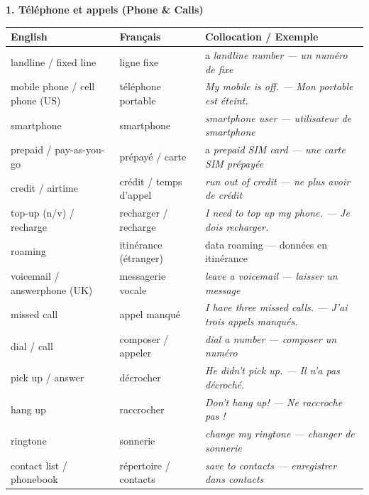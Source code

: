 \documentclass[11pt]{article}
\newcommand{\cle}[1]{{\popxbold\color{popdark}#1}}
\newcommand{\eng}[1]{\ifmmode\text{\textit{#1}}\else\begingroup\selectlanguage{english}\itshape #1\endgroup\fi}
\begin{document}
\textbf{1. Téléphone et appels (Phone \& Calls)}
\begin{center}
\begin{tabularx}{\linewidth}{|X|X|X|}\hline
\rowcolor{poporangeL} \textbf{English} & \textbf{Français} & \textbf{Collocation / Exemple} \\ \hline
\cle{landline} / \cle{fixed line} & ligne fixe & a \eng{landline number} — un numéro de fixe \\ \hline
\cle{mobile phone} / \cle{cell phone (US)} & téléphone portable & \eng{My mobile is off.} — Mon portable est éteint. \\ \hline
\cle{smartphone} & smartphone & \eng{smartphone user} — utilisateur de smartphone \\ \hline
\cle{prepaid} / \cle{pay-as-you-go} & prépayé / carte & a \eng{prepaid SIM card} — une carte SIM prépayée \\ \hline
\cle{credit} / \cle{airtime} & crédit / temps d'appel & \eng{run out of credit} — ne plus avoir de crédit \\ \hline
\cle{top-up} (n/v) / \cle{recharge} & recharger / recharge & \eng{I need to top up my phone.} — Je dois recharger. \\ \hline
\cle{roaming} & itinérance (étranger) & \cle{data roaming} — données en itinérance \\ \hline
\cle{voicemail} / \cle{answerphone (UK)} & messagerie vocale & \eng{leave a voicemail} — laisser un message \\ \hline
\cle{missed call} & appel manqué & \eng{I have three missed calls.} — J'ai trois appels manqués. \\ \hline
\cle{dial} / \cle{call} & composer / appeler & \eng{dial a number} — composer un numéro \\ \hline
\cle{pick up} / \cle{answer} & décrocher & \eng{He didn't pick up.} — Il n'a pas décroché. \\ \hline
\cle{hang up} & raccrocher & \eng{Don't hang up!} — Ne raccroche pas ! \\ \hline
\cle{ringtone} & sonnerie & \eng{change my ringtone} — changer de sonnerie \\ \hline
\cle{contact list} / \cle{phonebook} & répertoire / contacts & \eng{save to contacts} — enregistrer dans contacts \\ \hline
\end{tabularx}
\end{center}
\end{document}
